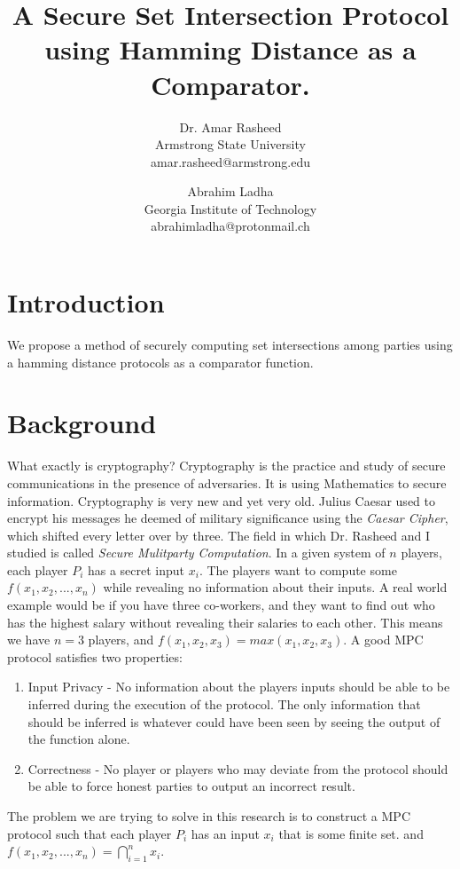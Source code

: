 \documentclass[10pt]{article}
\begin{document}
\title{A Secure Set Intersection Protocol using Hamming Distance as a Comparator.}
\author{Dr. Amar Rasheed\\ Armstrong State University\\amar.rasheed@armstrong.edu \and Abrahim Ladha\\ Georgia Institute of Technology\\ abrahimladha@protonmail.ch}
\maketitle


\newpage

\section{Introduction}
We propose a method of securely computing set intersections among parties using a hamming distance protocols as a comparator function. 
\section{Background}

What exactly is cryptography? Cryptography is the practice and study of secure communications in the presence of adversaries. It is using Mathematics to secure information. Cryptography is very new and yet very old. Julius Caesar used to encrypt his messages he deemed of military significance using the \textit{Caesar Cipher}, which shifted every letter over by three. The field in which Dr. Rasheed and I studied is called \textit{Secure Mulitparty Computation}. In a given system of $n$ players, each player $P_i$ has a secret input $x_i$. The players want to compute some $f(x_1,x_2,...,x_n)$ while revealing no information about their inputs. A real world example would be if you have three co-workers, and they want to find out who has the highest salary without revealing their salaries to each other. This means we have $n=3$ players, and $f(x_1,x_2,x_3) = max(x_1,x_2,x_3)$. A good MPC protocol satisfies two properties:
\begin{enumerate}
\item Input Privacy - No information about the players inputs should be able to be inferred during the execution of the protocol. The only information that should be inferred is whatever could have been seen by seeing the output of the function alone.
\item Correctness - No player or players who may deviate from the protocol should be able to force honest parties to output an incorrect result.  
\end{enumerate} 
The problem we are trying to solve in this research is to construct a MPC protocol such that each player $P_i$ has an input $x_i$ that is some finite set. and $f(x_1,x_2,...,x_n) = \bigcap_{i=1}^n x_i$. 
\end{document}
